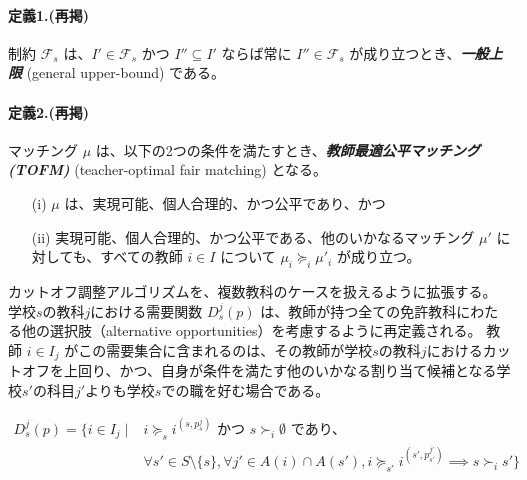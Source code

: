 \documentclass[12pt, a4paper]{article}
\theoremstyle{definition}
\theoremstyle{remark}
\theoremstyle{plain}
\begin{document}
\paragraph{定義1.(再掲)}
制約 $\mathcal{F}_s$ は、$I' \in \mathcal{F}_s$ かつ $I'' \subseteq I'$ ならば常に $I'' \in \mathcal{F}_s$ が成り立つとき、\textbf{\textit{一般上限}} (general upper-bound) である。


\paragraph{定義2.(再掲)}
マッチング $\mu$ は、以下の2つの条件を満たすとき、\textbf{\textit{教師最適公平マッチング (TOFM)}} (teacher-optimal fair matching) となる。
\begin{itemize}
    \item[(i)] $\mu$ は、実現可能、個人合理的、かつ公平であり、かつ
    \item[(ii)] 実現可能、個人合理的、かつ公平である、他のいかなるマッチング $\mu'$ に対しても、すべての教師 $i \in I$ について $\mu_i \succeq_i \mu'_i$ が成り立つ。
\end{itemize}


カットオフ調整アルゴリズムを、複数教科のケースを扱えるように拡張する。
学校$s$の教科$j$における需要関数 $D^j_s(p)$ は、教師が持つ全ての免許教科にわたる他の選択肢（alternative opportunities）を考慮するように再定義される。
教師 $i \in I_j$ がこの需要集合に含まれるのは、その教師が学校$s$の教科$j$におけるカットオフを上回り、かつ、自身が条件を満たす他のいかなる割り当て候補となる学校$s'$の科目$j'$よりも学校$s$での職を好む場合である。

\begin{align*}
  D^j_s(p) = \{ i \in I_j \mid {} & i \succeq_s i^{(s,p^j_s)} \text{ かつ } s \succ_i \emptyset \text{ であり、} \\
  & \forall s' \in S\setminus \{s\}, \forall j' \in A(i) \cap A(s'), 
  i \succeq_{s'} i^{(s',p^{j'}_{s'})} \implies s \succ_i s' \}
\end{align*}


\end{document}

